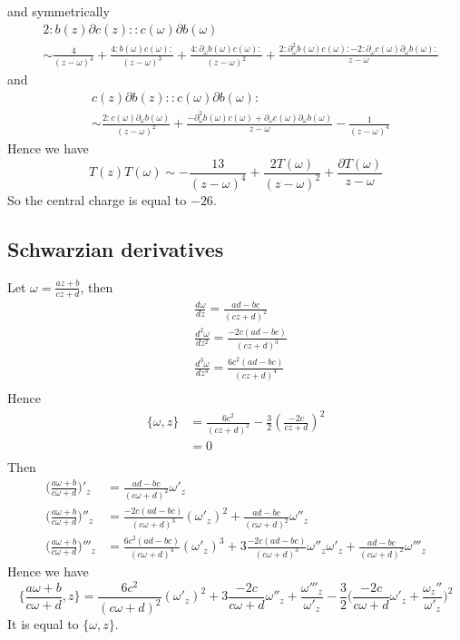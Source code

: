 \documentclass[11pt,a4paper]{article}
\theoremstyle{definition}
\begin{document}
 and symmetrically 
 \[
	\begin{aligned}
	&2: b(z) \partial c(z):: c(\omega) \partial b(\omega)\\
	& \sim \frac{4}{(z-\omega)^4} + \frac{4:b(\omega) c(\omega):}{(z-\omega)^3} + \frac{4 :\partial_\omega b(\omega) c(\omega):}{(z-\omega)^2} + \frac{2: \partial_\omega^2 b(\omega) c(\omega): -2 : \partial_\omega c(\omega) \partial_\omega b(\omega):}{z-\omega} 
	\end{aligned}
 \]
 and
 \[
	\begin{aligned}
	&c(z)\partial b(z) :: c(\omega) \partial b(\omega):\\
	& \sim \frac{2: c(\omega) \partial_{\omega}b(\omega) }{(z-\omega)^2} + \frac{-\partial^2_\omega b(\omega) c(\omega)+\partial_\omega c(\omega)\partial_\omega b(\omega)}{z-\omega} - \frac{1}{(z-\omega)^4}
	\end{aligned}
 \]
 Hence we have 
 \[
 T(z)T(\omega) \sim -\frac{13}{(z-\omega)^4} + \frac{2T(\omega)}{(z-\omega)^2} + \frac{\partial T(\omega)}{z-\omega}
 \]
 So the central charge is equal to $-26$.
\subsection{Schwarzian derivatives}
Let $\omega = \frac{az+b}{cz +d}$, then
\[
\begin{aligned}
&\frac{d\omega}{d z} = \frac{ad-bc}{(cz+d)^2}\\
&\frac{d^2\omega}{dz^2} = \frac{-2c(ad-bc)}{(cz+d)^3}\\
&\frac{d^3\omega}{dz^3} = \frac{6c^2(ad-bc)}{(cz+d)^4}\\
\end{aligned}
\]
Hence
\[
\begin{aligned}
\{\omega,z\} & = \frac{6c^2}{(cz+d)^2} -\frac{3}{2}(\frac{-2c}{cz+d})^2\\
&=0\\
\end{aligned}
\]
Then
\[
\begin{aligned}
\Big(\frac{a \omega +b}{c \omega +d}\Big)'_z &= \frac{ad-bc}{(c\omega +d)^2} \omega'_z\\
\Big(\frac{a \omega +b}{c \omega +d}\Big)''_z&= \frac{-2c(ad-bc)}{(c\omega+d)^3}(\omega'_z)^2 + \frac{ad-bc}{(c\omega +d)^2} \omega''_z\\
\Big(\frac{a \omega +b}{c \omega +d}\Big)'''_z&= \frac{6c^2(ad-bc)}{(c\omega +d)^4}(\omega'_z)^3 +3 \frac{-2c(ad-bc)}{(c\omega+d)^3} \omega''_z \omega'_z + \frac{ad-bc}{(c\omega +d)^2} \omega'''_z
\end{aligned}
\]
Hence we have
\[
\{ \frac{a \omega +b}{c\omega+d}, z\} = \frac{6c^2}{(c\omega +d)^2}(\omega'_z)^2 + 3 \frac{-2c}{c\omega+d} \omega''_z + \frac{\omega'''_z}{\omega'_z} - \frac{3}{2}\Big(\frac{-2c}{c\omega +d} \omega'_z + \frac{\omega_z''}{\omega'_z}\Big)^2
\]
It is equal to $\{\omega, z\}$.




\end{document}
